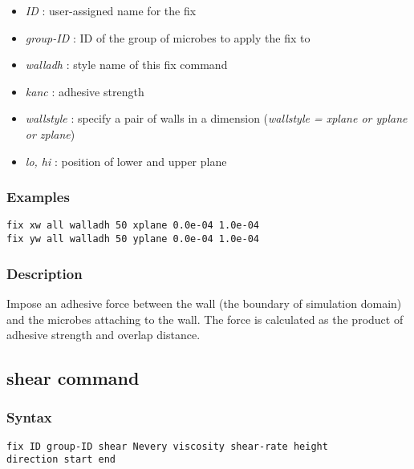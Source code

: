 \documentclass[11pt,a4paper,openright]{article}
\begin{document}
\begin{itemize}
\item
	{\it ID }: user-assigned name for the fix
\item
	{\it group-ID }: ID of the group of microbes to apply the fix to
\item
	{\it walladh }: style name of this fix command
\item
	{\it kanc }: adhesive strength
\item
	{\it wallstyle }: specify a pair of walls in a dimension ({\it wallstyle 		= xplane or yplane or zplane})
\item
	{\it lo, hi }: position of lower and upper plane

\end{itemize}

\subsubsection*{Examples}

\begin{Verbatim}[frame=single]
fix xw all walladh 50 xplane 0.0e-04 1.0e-04
fix yw all walladh 50 yplane 0.0e-04 1.0e-04
\end{Verbatim}

\subsubsection*{Description}

Impose an adhesive force between the wall (the boundary of simulation domain) and the microbes attaching to the wall. The force is calculated as the product of adhesive strength and overlap distance.

\newpage
\subsection{shear command}

\subsubsection*{Syntax}
\begin{Verbatim}[frame=single]
fix ID group-ID shear Nevery viscosity shear-rate height 
direction start end
\end{Verbatim}
\end{document}
